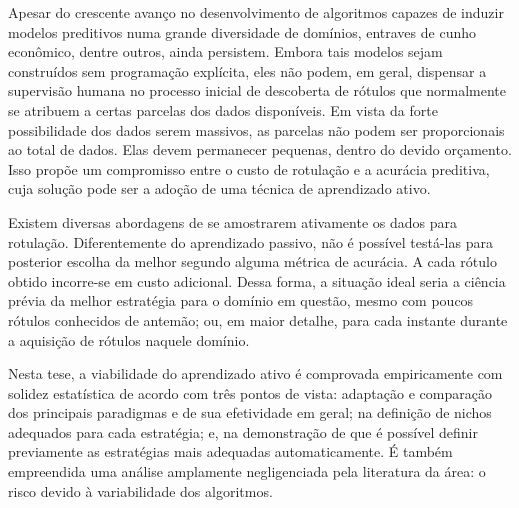 Apesar do crescente avanço no desenvolvimento de algoritmos capazes de induzir modelos preditivos
numa grande diversidade de domínios, entraves de cunho econômico, dentre outros, ainda persistem.
Embora tais modelos sejam construídos sem programação explícita,
eles não podem, em geral, dispensar a supervisão humana no processo inicial de descoberta de rótulos que
normalmente se atribuem a certas parcelas dos dados disponíveis.
Em vista da forte possibilidade dos dados serem massivos,
as parcelas não podem ser proporcionais ao total de dados.
Elas devem permanecer pequenas, dentro do devido orçamento.
Isso propõe um compromisso entre o custo de rotulação e a acurácia preditiva,
cuja solução pode ser a adoção de uma técnica de aprendizado ativo.

Existem diversas abordagens de se amostrarem ativamente os dados para rotulação.
Diferentemente do aprendizado passivo, não é possível testá-las para posterior escolha da melhor
segundo alguma métrica de acurácia.
A cada rótulo obtido incorre-se em custo adicional.
Dessa forma, a situação ideal seria a ciência prévia da melhor estratégia
para o domínio em questão, mesmo com poucos rótulos conhecidos de antemão;
ou, em maior detalhe,
para cada instante durante a aquisição de rótulos naquele domínio.

Nesta tese, a viabilidade do aprendizado ativo é comprovada empiricamente com
solidez estatística 
de acordo com três pontos de vista: adaptação e comparação dos principais
paradigmas e de sua efetividade em geral;
na definição de nichos adequados para cada estratégia;
e, na demonstração de que é possível definir previamente as estratégias mais
adequadas automaticamente. 
É também empreendida uma análise amplamente negligenciada pela
literatura da área:
o risco devido à variabilidade dos algoritmos.


\newpage
\thispagestyle{empty}
\mbox{}
